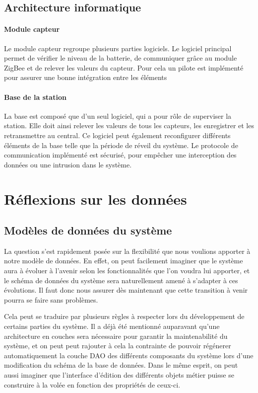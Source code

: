 \subsection{Architecture informatique}

\paragraph{Module capteur} Le module capteur regroupe plusieurs parties logiciels. Le logiciel principal permet de vérifier le niveau de la batterie, de communiquer grâce au module ZigBee et de relever les valeurs du capteur. Pour cela un pilote est implémenté pour assurer une bonne intégration entre les éléments

\paragraph{Base de la station} La base est composé que d’un seul logiciel, qui a pour rôle de superviser la station. Elle doit ainsi relever les valeurs de tous les capteurs, les enregistrer et les retransmettre au central. Ce logiciel peut également reconfigurer différents éléments de la base telle que la période de réveil du système. Le protocole de communication implémenté est sécurisé, pour empêcher une interception des données ou une intrusion dans le système.

\section{Réflexions sur les données}

\subsection{Modèles de données du système}

La question s'est rapidement posée sur la flexibilité que nous voulions apporter à notre modèle de données. En effet, on peut facilement imaginer que le système aura à évoluer à l'avenir selon les fonctionnalités que l'on voudra lui apporter, et le schéma de données du système sera naturellement amené à s'adapter à ces évolutions. Il faut donc nous assurer dès maintenant que cette transition à venir pourra se faire sans problèmes.

Cela peut se traduire par plusieurs règles à respecter lors du développement de certains parties du système. Il a déjà été mentionné auparavant qu'une architecture en couches sera nécessaire pour garantir la maintenabilité du système, et on peut peut rajouter à cela la contrainte de pouvoir régénerer automatiquement la couche DAO des différents composants du système lors d'une modification du schéma de la base de données. Dans le même esprit, on peut aussi imaginer que l'interface d'édition des différents objets métier puisse se construire à la volée en fonction des propriétés de ceux-ci.

